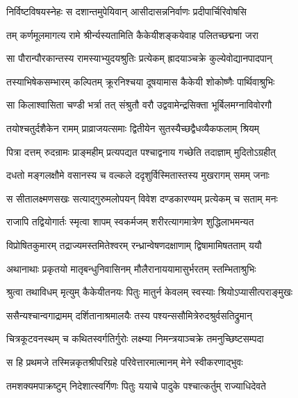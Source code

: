 
\twolineshloka
{निर्विष्टविषयस्नेहः स दशान्तमुपेयिवान्}
{आसीदासन्ननिर्वाणः प्रदीपार्चिरिवोषसि} %

\twolineshloka
{तम् कर्णमूलमागत्य रामे श्रीर्न्यस्यतामिति}
{कैकेयीशङ्कयेवाह पलितच्छद्मना जरा} %

\twolineshloka
{सा पौरान्पौरकान्तस्य रामस्याभ्युदयश्रुतिः}
{प्रत्येकम् ह्रादयाञ्चक्रे कुल्येवोद्यानपादपान्} %

\twolineshloka
{तस्याभिषेकसम्भारम् कल्पितम् क्रूरनिश्चया}
{दूषयामास कैकेयी शोकोष्णैः पार्थिवाश्रुभिः} %

\twolineshloka
{सा किलाश्वासिता चण्डी भर्त्रा तत् संश्रुतौ वरौ}
{उद्ववामेन्द्रसिक्ता भूर्बिलमग्नाविवोरगौ} %

\twolineshloka
{तयोश्चतुर्दशैकेन रामम् प्राव्राजयत्समाः}
{द्वितीयेन सुतस्यैच्छद्वैधव्यैकफलाम् श्रियम्} %

\twolineshloka
{पित्रा दत्तम् रुदन्रामः प्राङ्महीम् प्रत्यपद्यत}
{पश्चाद्वनाय गच्छेति तदाज्ञाम् मुदितोऽग्रहीत्} %

\twolineshloka
{दधतो मङ्गलक्षौमे वसानस्य च वल्कले}
{ददृशुर्विस्मितास्तस्य मुखरागम् समम् जनाः} %

\twolineshloka
{स सीतालक्ष्मणसखः सत्याद्गुरुमलोपयन्}
{विवेश दण्डकारण्यम् प्रत्येकम् च सताम् मनः} %

\twolineshloka
{राजापि तद्वियोगार्तः स्मृत्वा शापम् स्वकर्मजम्}
{शरीरत्यागमात्रेण शुद्धिलाभमन्यत} %

\twolineshloka
{विप्रोषितकुमारम् तद्राज्यमस्तमितेश्वरम्}
{रन्ध्रान्वेषणदक्षाणाम् द्विषामामिषतताम् ययौ} %

\twolineshloka
{अथानाथाः प्रकृतयो मातृबन्धुनिवासिनम्}
{मौलैरानाययामासुर्भरतम् स्तम्भिताश्रुभिः} %

\twolineshloka
{श्रुत्वा तथाविधम् मृत्युम् कैकेयीतनयः पितुः}
{मातुर्न केवलम् स्वस्याः श्रियोऽप्यासीत्पराङ्मुखः} %

\twolineshloka
{ससैन्यश्चान्वगाद्रामम् दर्शितानाश्रमालयैः}
{तस्य पश्यन्ससौमित्रेरुदश्रुर्वसतिद्रुमान्} %

\twolineshloka
{चित्रकूटवनस्थम् च कथितस्वर्गतिर्गुरोः}
{लक्ष्म्या निमन्त्रयाञ्चक्रे तमनुच्छिष्टसम्पदा} %

\twolineshloka
{स हि प्रथमजे तस्मिन्नकृतश्रीपरिग्रहे}
{परिवेत्तारमात्मानम् मेने स्वीकरणाद्भुवः} %

\twolineshloka
{तमशक्यमपाक्रष्टुम् निदेशात्स्वर्गिणः पितुः}
{ययाचे पादुके पश्चात्कर्तुम् राज्याधिदेवते} %

